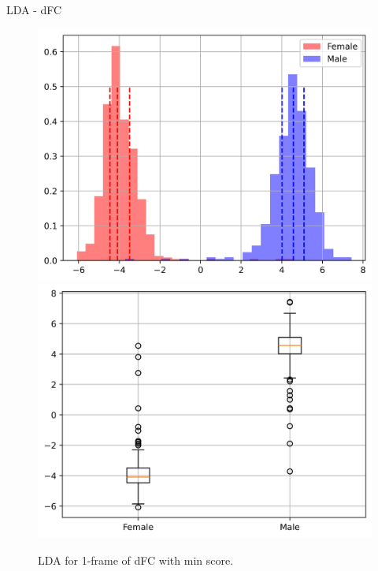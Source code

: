 \documentclass{beamer}
\begin{document}
\begin{frame}{LDA - dFC}
\begin{figure}[H]
{\begin{minipage}[b]{0.3\textwidth}
                \includegraphics[width=1\textwidth]{../Analysis/LDA/node=50_size=480_step=180_rho=0.1/hist_16.jpg}
                \includegraphics[width=1\textwidth]{../Analysis/LDA/node=50_size=480_step=180_rho=0.1/box_16.jpg}
            \end{minipage}
        }
        \caption{LDA for 1-frame of dFC with min score.}
    \end{figure}

\end{frame}

\end{document}
